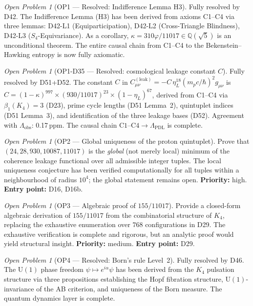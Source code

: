 \documentclass[11pt,a4paper]{article}
\theoremstyle{plain}
\theoremstyle{definition}
\theoremstyle{remark}
\newtheorem{openproblem}[theorem]{Open Problem}
\begin{document}
\begin{openproblem}[OP1 --- Resolved: Indifference Lemma H3]
\label{op:H3}
\textcolor{proofblue}{Fully resolved by D42.} The Indifference Lemma (H3) has been derived from axioms C1--C4 via three lemmas: D42-L1 (Equiparticipation), D42-L2 (Cross-Triangle Blindness), D42-L3 ($S_4$-Equivariance). As a corollary, $\kappa=310\varphi/11017\in\mathbb{Q}(\sqrt{5})$ is an unconditional theorem. The entire causal chain from C1--C4 to the Bekenstein--Hawking entropy is now fully axiomatic.
\end{openproblem}

\begin{openproblem}[OP1-D35 --- Resolved: cosmological leakage constant $C$]
\label{op:leakconstant}
\textcolor{proofblue}{Fully resolved by D51+D52.} The constant $C$ in $C^{(\mathrm{leak})}_{\mu\nu}=-C\,\eta_L^{18}(m_p c/\hbar)^2 g_{\mu\nu}$ is $C=(1-\kappa)^{997}\times(930/11017)^{23}\times(1-\eta_L)^{67}$, derived from C1--C4 via $\beta_1(K_4)=3$ (D23), prime cycle lengths (D51 Lemma~2), quintuplet indices (D51 Lemma~3), and identification of the three leakage bases (D52). Agreement with $\Lambda_{\mathrm{obs}}$: 0.17\,ppm. The causal chain $\mathrm{C1\text{--}C4}\to\Lambda_{\mathrm{PDL}}$ is complete.
\end{openproblem}

\begin{openproblem}[OP2 --- Global uniqueness of the proton quintuplet]
\label{op:uniqueness}
Prove that \\  $(24, 28, 930, 10087, 11017)$ is the \emph{global} (not merely local) minimum of the coherence leakage functional over all admissible integer tuples. The local uniqueness conjecture has been verified computationally for all tuples within a neighbourhood of radius $10^4$; the global statement remains open. \textbf{Priority:} high. \textbf{Entry point:} D16, D16b.
\end{openproblem}

\begin{openproblem}[OP3 --- Algebraic proof of $155/11017$]
\label{op:gate1algebraic}
Provide a closed-form algebraic derivation of $155/11017$ from the combinatorial structure of $K_4$, replacing the exhaustive enumeration over $768$ configurations in D29. The exhaustive verification is complete and rigorous, but an analytic proof would yield structural insight. \textbf{Priority:} medium. \textbf{Entry point:} D29.
\end{openproblem}

\begin{openproblem}[OP4 --- Resolved: Born's rule Level~2]
\label{op:bornlevel2}
\textcolor{proofblue}{Fully resolved by D46.} The $\mathrm{U}(1)$ phase freedom $\psi \mapsto e^{i\alpha}\psi$ has been derived from the $K_4$ pulsation structure via three propositions establishing the Hopf fibration structure, $\mathrm{U}(1)$-invariance of the AB criterion, and uniqueness of the Born measure. The quantum dynamics layer is complete.
\end{openproblem}
\end{document}
